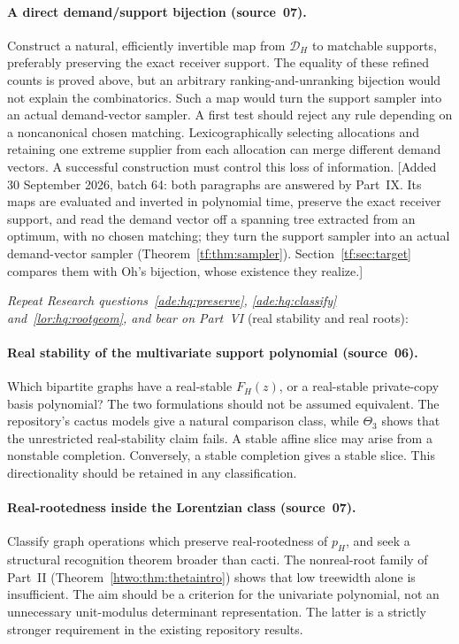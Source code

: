 \documentclass[11pt]{article}
\numberwithin{equation}{section}
\theoremstyle{definition}
\newcommand{\cD}{\mathcal D}
\begin{document}
\paragraph{A direct demand/support bijection (source~07).}
Construct a natural, efficiently invertible map from $\cD_H$ to matchable
supports, preferably preserving the exact receiver support. The equality of
these refined counts is proved above, but an arbitrary ranking-and-unranking
bijection would not explain the combinatorics. Such a map would turn the
support sampler into an actual demand-vector sampler.
A first test should reject any rule depending on a noncanonical chosen
matching. Lexicographically selecting allocations and retaining one extreme
supplier from each allocation can merge different demand vectors. A successful
construction must control this loss of information.
[Added 30 September 2026, batch 64: both paragraphs are answered by
Part~IX. Its maps are evaluated and inverted in polynomial time, preserve
the exact receiver support, and read the demand vector off a spanning
tree extracted from an optimum, with no chosen matching; they turn the
support sampler into an actual demand-vector sampler
(Theorem~\ref{tf:thm:sampler}). Section~\ref{tf:sec:target} compares
them with Oh's bijection, whose existence they realize.]


\noindent\emph{Repeat Research questions~\ref{ade:hq:preserve},
\ref{ade:hq:classify} and~\ref{lor:hq:rootgeom}, and bear on Part~VI}
(real stability and real roots):
\paragraph{Real stability of the multivariate support polynomial (source~06).}
Which bipartite graphs have a real-stable $F_H(z)$, or a real-stable
private-copy basis polynomial? The two formulations should not be assumed
equivalent. The repository's cactus models give a natural comparison
class, while $\Theta_3$ shows that the unrestricted real-stability claim
fails.
A stable affine slice may arise from a nonstable completion. Conversely,
a stable completion gives a stable slice. This directionality should be
retained in any classification.

\paragraph{Real-rootedness inside the Lorentzian class (source~07).}
Classify graph operations which preserve real-rootedness of $p_H$, and seek a
structural recognition theorem broader than cacti. The nonreal-root family of
Part~II (Theorem~\ref{htwo:thm:thetaintro}) shows that low treewidth alone is insufficient.
The aim should be a criterion for the univariate polynomial, not an unnecessary
unit-modulus determinant representation. The latter is a strictly stronger
requirement in the existing repository results.
\end{document}
